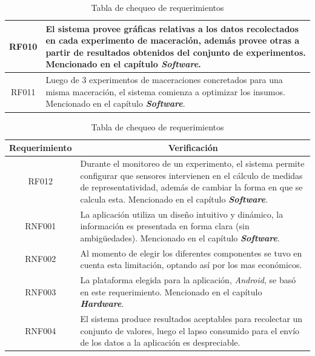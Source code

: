 \begin{table}[H]
\begin{tabularx}{\textwidth}{|X|X|}
        \hline
        \multicolumn{1}{|c|}{RF010}  & El sistema provee gráficas relativas a los datos recolectados en cada experimento de maceración, además provee otras a partir de resultados obtenidos del conjunto de experimentos. Mencionado en el capítulo \textit{\textbf{Software}}. \\
        \hline
        \multicolumn{1}{|c|}{RF011}  & Luego de 3 experimentos de maceraciones concretados para una misma maceración, el sistema comienza a optimizar los insumos. Mencionado en el capítulo \textit{\textbf{Software}}. \\
        \hline
        \end{tabularx}
        \caption{Tabla de chequeo de requerimientos}
        \label{tab:TablaChequeoRequerimientos}
        \end{table}
        
         \begin{table}[H]
        \centering
        \begin{tabularx}{\textwidth}{|X|X|}
        \hline
        \multicolumn{1}{|c|}{Requerimiento} & \multicolumn{1}{|c|}{Verificación}\\
        \hline
        \multicolumn{1}{|c|}{RF012}  & Durante el monitoreo de un experimento, el sistema permite configurar que sensores intervienen en el cálculo de medidas de representatividad, además de cambiar la forma en que se calcula esta. Mencionado en el capítulo \textit{\textbf{Software}}. \\
        \hline
        \multicolumn{1}{|c|}{RNF001}  & La aplicación utiliza un diseño intuitivo y dinámico, la información es presentada en forma clara (sin ambigüedades). Mencionado en el capítulo \textit{\textbf{Software}}. \\
        \hline
        \multicolumn{1}{|c|}{RNF002}  & Al momento de elegir los diferentes componentes se tuvo en cuenta esta limitación, optando así por los mas económicos.\\
        \hline
        \multicolumn{1}{|c|}{RNF003}  & La plataforma elegida para la aplicación, \textit{Android},  se basó en este requerimiento. Mencionado en el capítulo \textit{\textbf{Hardware}}. \\
        \hline
        \multicolumn{1}{|c|}{RNF004}  & El sistema produce resultados aceptables para recolectar un conjunto de valores, luego el lapso consumido para el envío de los datos a la aplicación es despreciable. \\
        \hline
     \end{tabularx}
     \caption{Tabla de chequeo de requerimientos}
 \end{table}

